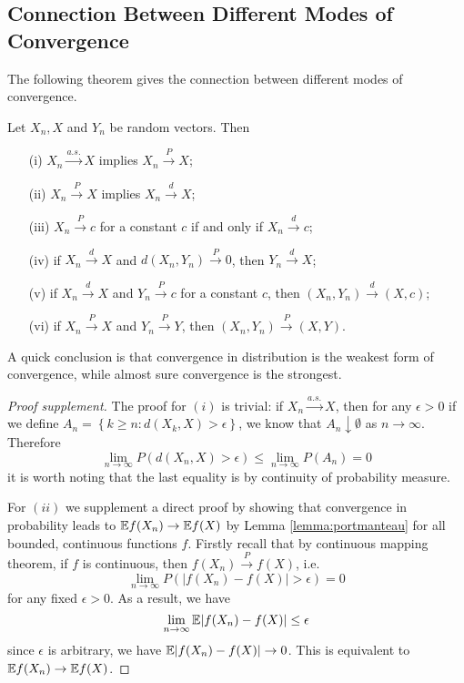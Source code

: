 \documentclass{article}
\begin{document}
\subsection{Connection Between Different Modes of Convergence}
The following theorem gives the connection between different modes of convergence.
\begin{theorem}
    Let $X_n, X$ and $Y_n$ be random vectors. Then
    \begin{itemize}
        \item[(i)] $X_n \xrightarrow{a.s.} X$ implies $X_n \xrightarrow{P} X$;
        \item[(ii)] $X_n \xrightarrow{P} X$ implies $X_n \xrightarrow{d} X$;
        \item[(iii)] $X_n \xrightarrow{P} c$ for a constant $c$ if and only if $X_n \xrightarrow{d} c$;
        \item[(iv)] if $X_n \xrightarrow{d} X$ and $d(X_n, Y_n) \xrightarrow{P} 0$, then $Y_n \xrightarrow{d} X$;
        \item[(v)] if $X_n \xrightarrow{d} X$ and $Y_n \xrightarrow{P} c$ for a constant $c$, then $(X_n, Y_n) \xrightarrow{d} (X, c)$;
        \item[(vi)] if $X_n \xrightarrow{P} X$ and $Y_n \xrightarrow{P} Y$, then $(X_n, Y_n) \xrightarrow{P} (X, Y)$.
    \end{itemize}
\end{theorem}
A quick conclusion is that convergence in distribution is the weakest form of convergence, while almost sure convergence is the strongest.
\begin{proof}[Proof supplement]\label{thm:connection}
    The proof for $(i)$ is trivial: if $X_n \xrightarrow{a.s.} X$, then for any $\epsilon > 0$ if we define $A_n = \left\{ k \geq n : d(X_k, X) > \epsilon \right\}$, we know that $A_n \downarrow \emptyset$ as $n \to \infty$. Therefore
    \begin{equation}
        \lim_{n\to\infty} P(d(X_n, X) > \epsilon) \leq \lim_{n\to\infty} P(A_n) = 0
    \end{equation}
    it is worth noting that the last equality is by continuity of probability measure.

    For $(ii)$ we supplement a direct proof by showing that convergence in probability leads to $\mathbb{E} f(X_n) \to \mathbb{E} f(X)$ by Lemma \ref{lemma:portmanteau} for all bounded, continuous functions $f$. Firstly recall that by continuous mapping theorem, if $f$ is continuous, then $f(X_n) \xrightarrow{P} f(X)$, i.e.
    \begin{equation}
        \lim_{n\to\infty} P(|f(X_n) - f(X)| > \epsilon) = 0
    \end{equation}
    for any fixed $\epsilon > 0$. As a result, we have
    \begin{equation}
        \lim_{n\to\infty} \mathbb{E} |f(X_n) - f(X)| \leq \epsilon
    \end{equation}
    since $\epsilon$ is arbitrary, we have $\mathbb{E} |f(X_n) - f(X)| \to 0$. This is equivalent to $\mathbb{E} f(X_n) \to \mathbb{E} f(X)$.
\end{proof}
\end{document}
